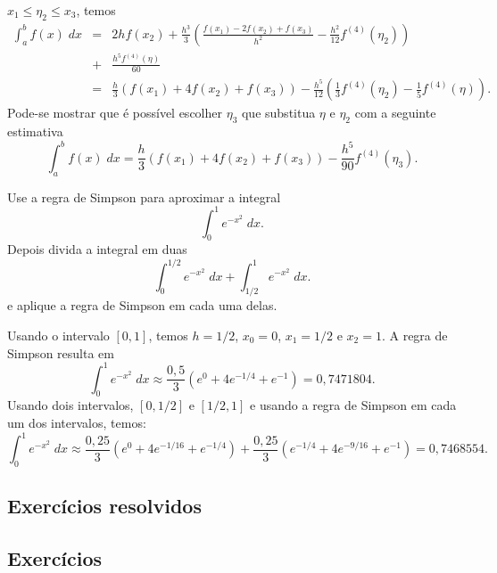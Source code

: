 $x_1\leq \eta_2\leq x_3$, temos
\begin{eqnarray}
\int_a^bf(x)\;dx&=&2hf(x_2)+\frac{h^3}{3}\left(\frac{f(x_1)-2f(x_2)+f(x_3)}{h^2}-\frac{h^2}{12}f^{(4)}(\eta_2)\right)\\
&+&\frac{h^5f^{(4)}(\eta)}{60}\\
&=&\frac{h}{3}\left(f(x_1)+4f(x_2)+f(x_3)\right)-\frac{h^5}{12}\left(\frac{1}{3}f^{(4)}(\eta_2)-\frac{1}{5}f^{(4)}(\eta)\right).
\end{eqnarray}
Pode-se mostrar que é possível escolher $\eta_3$ que substitua $\eta$ e $\eta_2$ com a seguinte estimativa
\begin{equation}
\int_a^bf(x)\;dx=\frac{h}{3}\left(f(x_1)+4f(x_2)+f(x_3)\right)-\frac{h^5}{90}f^{(4)}(\eta_3).
\end{equation}

\begin{ex}
Use a regra de Simpson para aproximar a integral
\begin{equation}
\int_0^1e^{-x^2}\;dx.
\end{equation}
Depois divida a integral em duas
\begin{equation}
\int_0^{1/2}e^{-x^2}\;dx+\int_{1/2}^{1}e^{-x^2}\;dx.
\end{equation}
e aplique a regra de Simpson em cada uma delas.
\end{ex}
Usando o intervalo $[0,1]$, temos $h=1/2$, $x_0=0$, $x_1=1/2$ e $x_2=1$. A regra de Simpson resulta em
\begin{equation}
\int_0^1e^{-x^2}\;dx\approx \frac{0,5}{3}(e^{0}+4e^{-1/4}+e^{-1})=0,7471804.
\end{equation}
Usando dois intervalos, $[0,1/2]$ e $[1/2,1]$ e usando a regra de Simpson em cada um dos intervalos, temos:
\begin{equation}
\int_0^1e^{-x^2}\;dx\approx \frac{0,25}{3}(e^{0}+4e^{-1/16}+e^{-1/4})+\frac{0,25}{3}(e^{-1/4}+4e^{-9/16}+e^{-1})=0,7468554.
\end{equation}

\subsection*{Exercícios resolvidos}

\construirExeresol

\subsection*{Exercícios}


